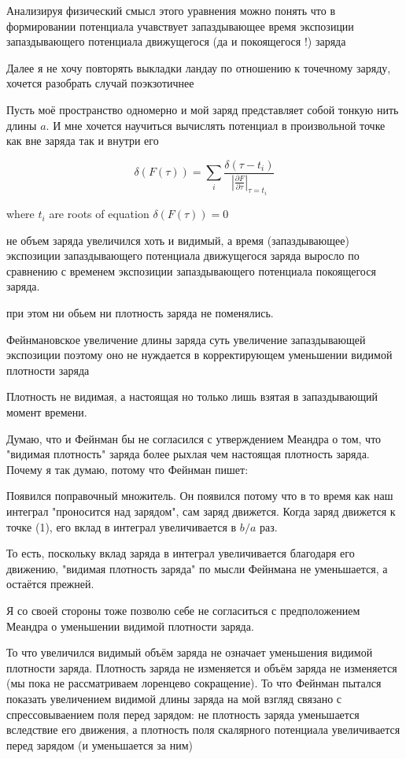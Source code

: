 \documentclass{article}
\begin{document}
Анализируя физический смысл этого уравнения можно понять что в формировании потенциала учавствует запаздывающее время экспозиции запаздывающего потенциала движущегося (да и покоящегося !) заряда

Далее я не хочу повторять выкладки ландау по отношению к точечному заряду, хочется разобрать случай поэкзотичнее

Пусть моё пространство одномерно и мой заряд представляет собой тонкую нить длины $a$. И мне хочется научиться вычислять потенциал в произвольной точке как вне заряда так и внутри его 

$$\delta(F(\tau)) = \sum\limits_{i}^{}\frac{\delta(\tau - t_{i})}{|\frac{\partial F}{\partial \tau}|_{\tau=t_{i}}}$$

where $t_{i}$ are roots of equation $\delta(F(\tau))=0$

не объем заряда увеличился хоть и видимый, а время (запаздывающее) экспозиции запаздывающего потенциала движущегося заряда выросло по сравнению с временем экспозиции запаздывающего потенциала покоящегося заряда.

при этом ни обьем ни плотность заряда не поменялись.

Фейнмановское увеличение длины заряда суть увеличение запаздывающей экспозиции поэтому оно не нуждается в корректирующем уменьшении видимой плотности заряда

Плотность не видимая, а настоящая но только лишь взятая  в запаздывающий момент времени.

Думаю, что и Фейнман бы не согласился с утверждением Меандра о том, что "видимая плотность" заряда более рыхлая чем настоящая плотность заряда. Почему я так думаю, потому что Фейнман пишет:

Появился поправочный множитель. Он появился потому что в то время как наш интеграл "проносится над зарядом", сам заряд движется. Когда заряд движется к точке (1), его вклад в интеграл увеличивается в $b/a$ раз.

То есть, поскольку вклад заряда в интеграл увеличивается благодаря его движению, "видимая плотность заряда" по мысли Фейнмана не уменьшается, а остаётся прежней. 

Я со своей стороны тоже позволю себе не согласиться с предположением Меандра о уменьшении видимой плотности заряда. 

То что увеличился видимый объём заряда не означает уменьшения видимой плотности заряда. Плотность заряда не изменяется и объём заряда не изменяется (мы пока не рассматриваем лоренцево сокращение). То что Фейнман пытался показать увеличением видимой длины заряда на мой взгляд связано с спрессовываением поля перед зарядом: не плотность заряда уменьшается вследствие его движения, а плотность поля скалярного потенциала увеличивается перед зарядом (и уменьшается за ним)
\end{document}

